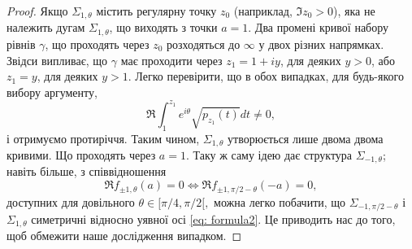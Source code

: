 \documentclass[]{article}
\theoremstyle{plain}
\begin{document}
\begin{proof}
Якщо $\Sigma_{1,\theta}$ містить регулярну точку $z_0$ (наприклад, $\Im z_0 > 0$), яка не належить дугам $\Sigma_{1,\theta}$, що виходять з точки $a = 1$. Два промені кривої набору рівнів $\gamma$, що проходять через $z_0$ розходяться до $\infty$ у двох різних напрямках. Звідси випливає, що $\gamma$ має проходити через $z_1 = 1 + iy$, для деяких $y > 0$, або $z_1 = y$, для деяких $y > 1$. Легко перевірити, що в обох випадках, для будь-якого вибору аргументу,
\[ \Re \int_{1}^{z_1} e^{i\theta} \sqrt{p_{z_1}(t)} dt \neq 0, \]
і отримуємо протиріччя. Таким чином, $\Sigma_{1,\theta}$ утворюється лише двома двома кривими. Що проходять через $a = 1$. Таку ж саму ідею дає структура  $\Sigma_{-1,\theta}$; навіть більше, з співвідношення
\begin{equation} \label{eq: formula2}
    \Re f_{\pm 1,\theta}(a) = 0 \iff \Re f_{\pm 1, \pi/2 - \theta}(-a) = 0,
\end{equation}
доступних для довільного $\theta \in [\pi/4, \pi/2 [,$ можна легко побачити, що $\Sigma_{-1, \pi/2 - \theta}$ і $\Sigma_{1, \theta}$ симетричні відносно уявної осі \eqref{eq: formula2}. Це приводить нас до того, щоб обмежити наше дослідження випадком.
\end{proof}
\end{document}
